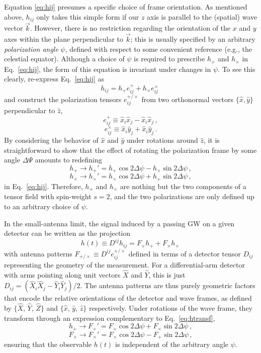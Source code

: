 \documentclass[aps,prd,twocolumn,superscriptaddress,preprintnumbers,floatfix,nofootinbib]{revtex4-2}
\newcommand{\beq}{\begin{equation}}
\newcommand{\eeq}{\end{equation}}
\newcommand*{\eq}[1]{Eq.~\eqref{eq:#1}}
\begin{document}
Equation \eqref{eq:hij} presumes a specific choice of frame orientation.
As mentioned above, $h_{ij}$ only takes this simple form if our $z$ axis is parallel to the (spatial) wave vector $\vec{k}$.
However, there is no restriction regarding the orientation of the $x$ and $y$ axes within the plane perpendicular to $\vec{k}$; this is usually specified by an arbitrary \emph{polarization angle} $\psi$, defined with respect to some convenient reference (e.g., the celestial equator).
Although a choice of $\psi$ is required to prescribe $h_+$ and $h_\times$ in \eq{hij}, the form of this equation is invariant under changes in $\psi$.
To see this clearly, re-express \eq{hij} as 
\beq
h_{ij} = h_+ e^+_{ij} + h_\times e^\times_{ij}\,\,
\eeq
and construct the polarization tensors $e^{+/\times}_{ij}$ from two orthonormal vectors $\{\hat{x},\hat{y}\}$ perpendicular to $\hat{z}$,
\beq
e^+_{ij} \equiv \hat{x}_i \hat{x}_j - \hat{x}_i \hat{x}_j \, ,
\eeq
\beq
e^\times_{ij} \equiv \hat{x}_i \hat{y}_j + \hat{x}_i \hat{y}_j\, .
\eeq
By considering the behavior of $\hat{x}$ and $\hat{y}$ under rotations around $\hat{z}$, it is straightforward to show that the effect of rotating the polarization frame by some angle $\Delta\Psi$ amounts to redefining
\beq \label{eq:htransf}
h_+ \rightarrow h_+' = h_+ \cos 2\Delta \psi - h_\times \sin 2\Delta\psi \, ,
\eeq
\beq
h_\times \rightarrow h_\times' = h_\times \cos 2\Delta \psi + h_+ \sin 2\Delta\psi \, ,
\eeq
in \eq{hij}.
Therefore, $h_+$ and $h_\times$ are nothing but the two components of a tensor field with spin-weight $s=2$, and the two polarizations are only defined up to an arbitrary choice of $\psi$.

In the small-antenna limit, the signal induced by a passing GW on a given detector can be written as the projection
\beq
h(t) \equiv D^{ij} h_{ij} = F_+ h_+ + F_\times h_\times\, 
\eeq
with antenna patterns $F_{+/\times} \equiv D^{ij} e^{+/\times}_{ij}$ defined in terms of a detector tensor $D_{ij}$ representing the geometry of the measurement.
For a differential-arm detector with arms pointing along unit vectors $\hat{X}$ and $\hat{Y}$, this is just $D_{ij} = (\hat{X}_i \hat{X}_j - \hat{Y}_i \hat{Y}_j)/2$.
The antenna patterns are thus purely geometric factors that encode the relative orientations of the detector and wave frames, as defined by $\{\hat{X},\, \hat{Y},\, \hat{Z}\}$ and $\{\hat{x},\, \hat{y},\, \hat{z}\}$ respectively.
Under rotations of the wave frame, they transform through an expression complementary to \eq{htransf},
\beq \label{eq:Ftransf}
h_+ \rightarrow F_+' = F_+ \cos 2\Delta \psi + F_\times \sin 2\Delta\psi \, ,
\eeq
\beq
F_\times \rightarrow F_\times' = F_\times \cos 2\Delta \psi - F_+ \sin 2\Delta\psi \, ,
\eeq
ensuring that the observable $h(t)$ is independent of the arbitrary angle $\psi$.
\end{document}
